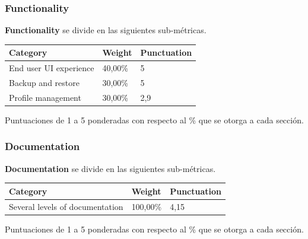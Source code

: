 \documentclass[xcolor=dvipsnames]{beamer}
\begin{document}
\begin{frame}[allowframebreaks]
\frametitle{Functionality}

\par \textbf{Functionality} se divide en las siguientes sub-m\'etricas.

\begin{tabular}{|l|l|l|}
    \hline {\bf Category} & {\bf Weight} & {\bf Punctuation}\\
    \hline End user UI experience & 40,00\% & 5\\
    \hline Backup and restore & 30,00\% & 5\\
    \hline Profile management & 30,00\% & 2,9\\
    \hline
\end{tabular}

Puntuaciones de 1 a 5 ponderadas con respecto al \% que se otorga a cada secci\'on.

\end{frame}

\begin{frame}[allowframebreaks]
\frametitle{Documentation}

\par \textbf{Documentation} se divide en las siguientes sub-m\'etricas.

\begin{tabular}{|l|l|l|}
    \hline {\bf Category} & {\bf Weight} & {\bf Punctuation}\\
    \hline Several levels of documentation & 100,00\% & 4,15\\
    \hline
\end{tabular}

Puntuaciones de 1 a 5 ponderadas con respecto al \% que se otorga a cada secci\'on.

\end{frame}
\end{document}
